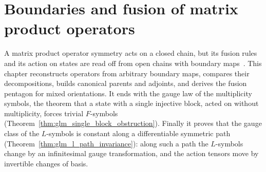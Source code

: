 \chapter{Boundaries and fusion of matrix product operators}
\label{ch:mpo_boundaries}

A matrix product operator symmetry acts on a closed chain, but its fusion rules
and its action on states are read off from open chains with boundary
maps~\cite{Bultinck2017Anyons,GarreRubio2023MPOSym}. This chapter reconstructs
operators from arbitrary boundary maps, compares their decompositions, builds
canonical parents and adjoints, and derives the fusion pentagon for mixed
orientations. It ends with the gauge law of the multiplicity symbols, the
theorem that a state with a single injective block, acted on without
multiplicity, forces trivial $F$-symbols
(Theorem~\ref{thm:glm_single_block_obstruction}). Finally it proves
that the gauge class of the $L$-symbols is constant along a differentiable
symmetric path (Theorem~\ref{thm:glm_l_path_invariance}): along such a path
the $L$-symbols change by an infinitesimal gauge transformation, and the
action tensors move by invertible changes of basis.















